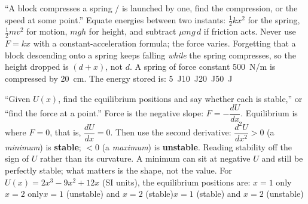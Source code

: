 {``A block compresses a spring / is launched by one, find the compression, or the speed at some
point.''}
{Equate energies between two instants: $\tfrac12kx^2$ for the spring, $\tfrac12mv^2$ for motion,
$mgh$ for height, and subtract $\mu mg\,d$ if friction acts. Never use $F=kx$ with a
constant-acceleration formula; the force varies.}
{Forgetting that a block descending onto a spring keeps falling \emph{while} the spring compresses, so
the height dropped is $(d+x)$, not $d$.}
{A spring of force constant \SI{500}{N/m} is compressed by \SI{20}{cm}. The energy stored is:}
{\SI{5}{J}}{\SI{10}{J}}{\SI{20}{J}}{\SI{50}{J}}

{``Given $U(x)$, find the equilibrium positions and say whether each is stable,'' or ``find the force at
a point.''}
{Force is the negative slope: $F=-\dfrac{dU}{dx}$. Equilibrium is where $F=0$, that is,
$\dfrac{dU}{dx}=0$. Then use the second derivative: $\dfrac{d^2U}{dx^2}>0$ (a \emph{minimum}) is
\textbf{stable}; $<0$ (a \emph{maximum}) is \textbf{unstable}.}
{Reading stability off the sign of $U$ rather than its curvature. A minimum can sit at negative $U$ and
still be perfectly stable; what matters is the shape, not the value.}
{For $U(x)=2x^3-9x^2+12x$ (SI units), the equilibrium positions are:}
{$x=1$ only}{$x=2$ only}{$x=1$ (unstable) and $x=2$ (stable)}{$x=1$ (stable) and $x=2$
(unstable)}

